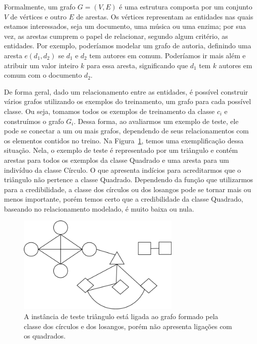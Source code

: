 Formalmente, um grafo $G = (V,E)$ é uma estrutura composta por um conjunto $V$ de vértices e outro $E$ de arestas. Os vértices representam as entidades nas quais estamos interessados, seja um documento, uma música ou uma enzima; por sua vez, as arestas cumprem o papel de relacionar, segundo algum critério, as entidades. Por exemplo, poderíamos modelar um grafo de autoria, definindo uma aresta $e(d_1,d_2)$ se $d_1$ e $d_2$ tem autores em comum. Poderíamos ir mais além e atribuir um valor inteiro $k$ para essa aresta, significando que $d_1$ tem $k$ autores em comum com o documento $d_2$.

De forma geral, dado um relacionamento entre as entidades, é possível construir vários grafos utilizando os exemplos do treinamento, um grafo para cada possível classe. Ou seja, tomamos todos os exemplos de treinamento da classe $c_i$ e construímos o grafo $G_i$. Dessa forma, ao avaliarmos um exemplo de teste, ele pode se conectar a um ou mais grafos, dependendo de seus relacionamentos com os elementos contidos no treino. Na Figura~\ref{fig::grafo}, temos uma exemplificação dessa situação. Nela, o exemplo de teste é representado por um triângulo e contém arestas para todos os exemplos da classe Quadrado e uma aresta para um indivíduo da classe Círculo. O que apresenta indícios para acreditarmos que o triângulo não pertence a classe Quadrado. Dependendo da função que utilizarmos para a credibilidade, a classe dos círculos ou dos losangos pode se tornar mais ou menos importante, porém temos certo que a credibilidade da classe Quadrado, baseando no relacionamento modelado, é muito baixa ou nula.

\begin{figure}[ht!]
\centering
\includegraphics[width=0.7\textwidth]{figures/grafo.png}
\caption{A instância de teste triângulo está ligada ao grafo formado pela classe dos círculos e dos losangos, porém não apresenta ligações com os quadrados.}
\label{fig::grafo}
\end{figure}

